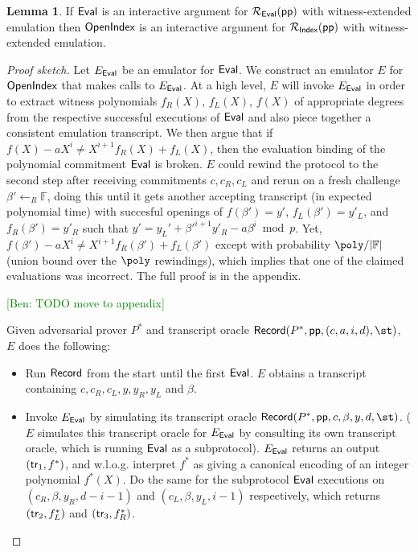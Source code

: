 \documentclass{article}
\theoremstyle{definition}
\newtheorem{lemma}{Lemma}
\newcommand{\ben}[1]{{\textcolor{green}{[Ben: #1]}}}
\newcommand{\ben}[1]{}
\begin{document}
\begin{lemma} 
If $\textsf{{Eval}}$ is an interactive argument for $\mathcal{R_\textsf{Eval}}(\textsf{pp})$ with witness-extended emulation then $\textsf{{OpenIndex}}$ is an interactive argument for $\mathcal{R_\textsf{Index}}(\textsf{pp})$ with witness-extended emulation. 
\end{lemma}

\begin{proof}[Proof sketch]
Let $E_{\textsf{{Eval}}}$ be an emulator for $\textsf{{Eval}}$. We construct an emulator $E$ for $\textsf{{OpenIndex}}$ that makes calls to $E_{\textsf{{Eval}}}$. At a high level, $E$ will invoke $E_{\textsf{{Eval}}}$ in order to extract witness polynomials $f_R(X)$, $f_L(X)$, $f(X)$ of appropriate degrees from the respective successful executions of $\textsf{{Eval}}$ and also piece together a consistent emulation transcript. We then argue that if $f(X) - a X^i \neq X^{i+1} f_R(X) + f_L(X)$, then the evaluation binding of the polynomial commitment $\textsf{{Eval}}$ is broken. $E$ could rewind the protocol to the second step after receiving commitments $c, c_R, c_L$ and rerun on a fresh challenge $\beta' \leftarrow_R \mathbb{F}$, doing this until it gets another accepting transcript (in expected polynomial time) with succesful openings of $f(\beta') = y'$, $f_L(\beta') = y'_L$, and $f_R(\beta') = y'_R$ such that $y' = y_L' + \beta'^{i+1} y'_R - a \beta^i \bmod p$. Yet, $f(\beta') - a X^i \neq X^{i+1} f_R(\beta') + f_L(\beta')$ except with probability $\poly / |\mathbb{F}|$ (union bound over the $\poly$ rewindings), which implies that one of the claimed evaluations was incorrect. The full proof is in the appendix. 

\ben{TODO move to appendix}

Given adversarial prover $P^*$ and transcript oracle $\pro{Record}(P^*, \params, (c, a, i, d), \st)$, $E$ does the following: 

\begin{itemize} 
\item Run $\textsf{{Record}}$ from the start until the first $\textsf{{Eval}}$. $E$ obtains a transcript containing $c, c_R, c_L, y, y_R, y_L$ and $\beta$. 

\item Invoke $E_{\textsf{{Eval}}}$ by simulating its transcript oracle $\pro{Record}(P^*, \params, c, \beta, y, d, \st)$. ($E$ simulates this transcript oracle for $E_{\textsf{{Eval}}}$ by consulting its own transcript oracle, which is running $\textsf{{Eval}}$ as a subprotocol). $E_{\textsf{{Eval}}}$ returns an output $(\textsf{{tr}}_1, f^*)$, and w.l.o.g. interpret $f^*$ as giving a canonical encoding of an integer polynomial $f^*(X)$. Do the same for the subprotocol $\textsf{{Eval}}$ executions on $(c_R, \beta, y_R, d - i - 1)$ and $(c_L, \beta, y_L, i-1)$ respectively, which returns $(\textsf{{tr}}_2, f_L^*)$ and $(\textsf{{tr}}_3, f_R^*)$. 


\end{itemize}
\end{proof}
\end{document}
